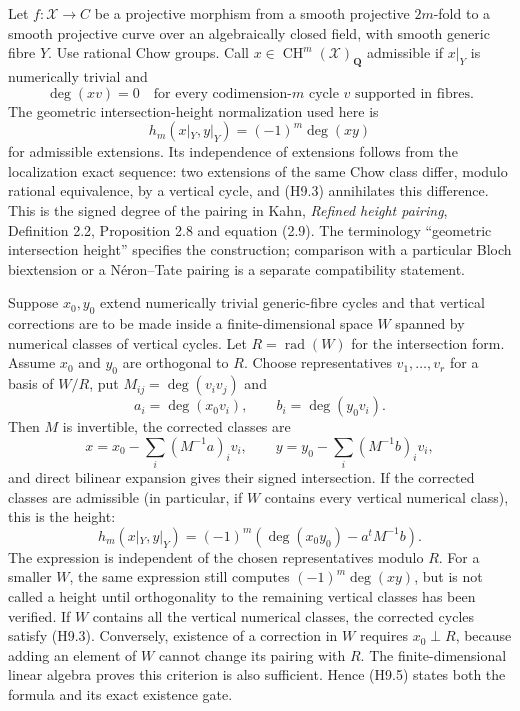 Let $f:\mathcal X\to C$ be a projective morphism from a smooth projective
$2m$-fold to a smooth projective curve over an algebraically closed field,
with smooth generic fibre $Y$. Use rational Chow groups. Call
$x\in\operatorname{CH}^m(\mathcal X)_{\mathbf Q}$ admissible if
$x|_Y$ is numerically trivial and
\[
 \deg(xv)=0
 \quad\text{for every codimension-$m$ cycle $v$ supported in fibres.}
                                                        \tag{H9.3}
\]
The geometric intersection-height normalization used here is
\[
 h_m(x|_Y,y|_Y)=(-1)^m\deg(xy)                    \tag{H9.4}
\]
for admissible extensions. Its independence of extensions follows from
the localization exact sequence: two extensions of the same Chow class
differ, modulo rational equivalence, by a vertical cycle, and (H9.3)
annihilates this difference. This is the signed degree of the pairing in
Kahn, \emph{Refined height pairing}, Definition 2.2, Proposition 2.8 and
equation (2.9). The terminology ``geometric intersection height'' specifies
the construction; comparison with a particular Bloch biextension or a
N\'eron--Tate pairing is a separate compatibility statement.

Suppose $x_0,y_0$ extend numerically trivial generic-fibre cycles and that
vertical corrections are to be made inside a finite-dimensional space
$W$ spanned by numerical classes of vertical cycles. Let
$R=\operatorname{rad}(W)$ for the intersection form. Assume $x_0$ and $y_0$
are orthogonal to $R$. Choose representatives $v_1,\ldots,v_r$ for a basis
of $W/R$, put $M_{ij}=\deg(v_iv_j)$ and
\[
 a_i=\deg(x_0v_i),\qquad b_i=\deg(y_0v_i).
\]
Then $M$ is invertible, the corrected classes are
\[
 x=x_0-\sum_i(M^{-1}a)_i v_i,\qquad
 y=y_0-\sum_i(M^{-1}b)_i v_i,
\]
and direct bilinear expansion gives their signed intersection. If the
corrected classes are admissible (in particular, if $W$ contains every
vertical numerical class), this is the height:
\[
 h_m(x|_Y,y|_Y)=(-1)^m\left(\deg(x_0y_0)-a^{\!t}M^{-1}b\right).
                                                        \tag{H9.5}
\]
The expression is independent of the chosen representatives modulo $R$.
For a smaller $W$, the same expression still computes
$(-1)^m\deg(xy)$, but is not called a height until orthogonality to the
remaining vertical classes has been verified.
If $W$ contains all the vertical numerical classes, the corrected cycles
satisfy (H9.3). Conversely, existence of a correction in $W$ requires
$x_0\perp R$, because adding an element of $W$ cannot change its pairing
with $R$. The finite-dimensional linear algebra proves this criterion is
also sufficient. Hence (H9.5) states both the formula and its exact
existence gate.

